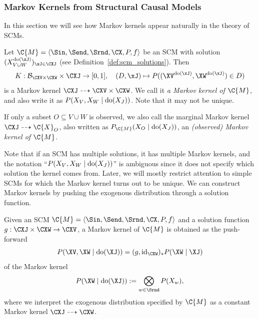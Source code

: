 \subsubsection{Markov Kernels from Structural Causal Models}

In this section we will see how Markov kernels appear naturally in the theory of SCMs.

\begin{Def}\label{def:scm_kernels}
  Let $\C{M} = \langle \Sin, \Send, \Srnd, \CX, P, f \rangle$ be an SCM with solution
  $(X_{V\cup W}^{\doit(\xJ)})_{\xJ\in\CXJ}$ (see Definition~\ref{def:scm_solutions}). Then
  $$K : \Bcal_{\CXV \times \CXW} \times \CXJ \to [0,1], \quad (D,\xJ) \mapsto P((\XV^{\doit(\xJ)},\XW^{\doit(\xJ)})\in D)$$
  is a Markov kernel $\CXJ \dshto \CXV \times \CXW$. We call it \emph{a Markov kernel of $\C{M}$}, and
  also write it as $P(X_V,X_W \mid \operatorname{do}(X_J))$. Note that it may not be unique.

  If only a subset $O \subseteq V \cup W$ is observed, we also call the marginal Markov kernel
  $\CXJ \dshto \C{X}_O$, also written as $P_{\C{M}}(X_O \mid \doit(X_J))$, an \emph{(observed) Markov kernel of $\C{M}$}.
\end{Def}
  Note that if an SCM has multiple solutions, it has multiple Markov kernels, and the notation
  ``$P(X_V,X_W \mid \operatorname{do}(X_J))$'' is ambiguous since it does not specify which solution the kernel comes
  from. Later, we will mostly restrict attention to simple SCMs for which the Markov kernel turns out to be unique.
  We can construct Markov kernels by pushing the exogenous distribution through a solution function.
\begin{Rem}
  Given an SCM $\C{M} = \langle \Sin, \Send, \Srnd, \CX, P, f \rangle$
  and a solution function $g : \CXJ \times \CXW \to \CXV$, a Markov kernel of $\C{M}$ is obtained as
  the push-forward
  $$P(\XV,\XW \mid \doit(\XJ)) = (g,\id_{\CXW})_* P(\XW \mid \XJ)$$
  of the Markov kernel
  $$P(\XW \mid \doit(\XJ)) := \bigotimes_{w\in\Srnd} P(X_w),$$
  where we interpret the exogenous distribution specified by $\C{M}$ as a constant Markov kernel $\CXJ \dshto \CXW$.
%
\end{Rem}
